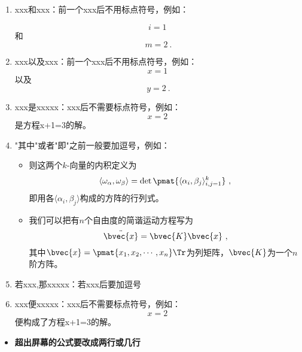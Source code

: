 \begin{enumerate}
\item xxx和xxx：前一个xxx后不用标点符号，例如：

\begin{equation}
i=1~
\end{equation}
和
\begin{equation}
m=2~.
\end{equation}
\item xxx以及xxx：前一个xxx后不用标点符号，例如：
\begin{equation}
x=1~
\end{equation}
以及
\begin{equation}
y=2~.
\end{equation}

 \item xxx是xxxxx：xxx后不需要标点符号，例如：
\begin{equation}
x=2~
\end{equation}
是方程x+1=3的解。
\item "其中"或者"即"之前一般要加逗号，例如：
\begin{itemize}
\item 则这两个$k$-向量的内积定义为
\begin{equation}
\langle\omega_\alpha, \omega_\beta\rangle = \det \pmat{\langle \alpha_i, \beta_j \rangle_{i, j=1}^k}~,
\end{equation}
即用各$\langle \alpha_i, \beta_j \rangle$构成的方阵的行列式。
\end{itemize}
\begin{itemize}
\item 
我们可以把有$n$个自由度的简谐运动方程写为
\begin{equation}
\ddot{\bvec{x}} = \bvec{K}\bvec{x}~,
\end{equation}
其中$\bvec{x}=\pmat{x_1, x_2, \cdots, x_n}\Tr$为列矩阵，$\bvec{K}$为一个$n$阶方阵。

\end{itemize}
\item 若xxx,那xxxxx：若xxx后要加逗号
\item xxx便xxxxx：xxx后不需要标点符号，例如：
\begin{equation}
x=2~
\end{equation}
便构成了方程x+1=3的解。

\end{enumerate}
\begin{itemize}
\item \textbf{超出屏幕的公式要改成两行或几行}
\end{itemize}




